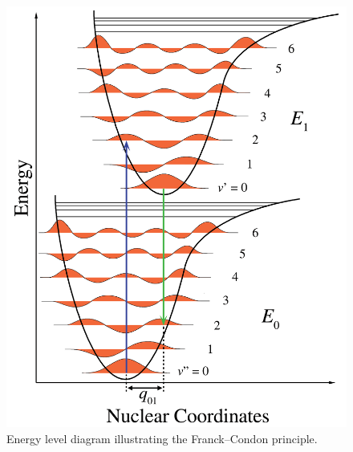 \documentclass[
  9pt,
]{extbook}
\theoremstyle{definition}
\theoremstyle{definition}
\theoremstyle{definition}
\theoremstyle{remark}
\begin{document}
\begin{figure}

{\centering \includegraphics[width=0.7\linewidth]{./img/OEP_wiki8} 

}

\caption{Energy level diagram illustrating the Franck–Condon principle.}\label{fig:Fig4c13}
\end{figure}
\end{document}
